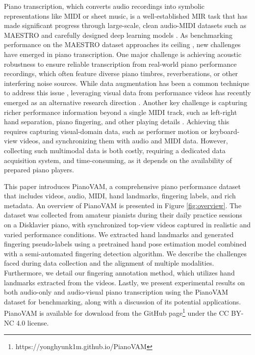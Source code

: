 \documentclass{article}
\begin{document}
Piano transcription, which converts audio recordings into symbolic representations like MIDI or sheet music, is a well-established MIR task that has made significant progress through large-scale, clean audio-MIDI datasets such as MAESTRO \cite{ISMIR18Hawthorne} and carefully designed deep learning models \cite{TASLP21Kong, ISMIR22Wei}. As benchmarking performance on the MAESTRO dataset approaches its ceiling \cite{ISMIR24Yan}, new challenges have emerged in piano transcription. One major challenge is achieving acoustic robustness to ensure reliable transcription from real-world piano performance recordings, which often feature diverse piano timbres, reverberations, or other interfering noise sources. While data augmentation has been a common technique to address this issue \cite{ICLR19Hawthorne, Edwards2024}, leveraging visual data from performance videos has recently emerged as an alternative research direction \cite{CJE15Wan, DAFx21Wang, ICASSPW23Li, TASLP24Li}. Another key challenge is capturing richer performance information beyond a single MIDI track, such as left-right hand separation, piano fingering, and other playing details \cite{InfoSci20Nakamura, MM22Ramoneda}. Achieving this requires capturing visual-domain data, such as performer motion or keyboard-view videos, and synchronizing them with audio and MIDI data. However, collecting such multimodal data is both costly, requiring a dedicated data acquisition system, and time-consuming, as it depends on the availability of prepared piano players. 

This paper introduces PianoVAM, a comprehensive piano performance dataset that includes videos, audio, MIDI, hand landmarks, fingering labels, and rich metadata. An overview of PianoVAM is presented in Figure \ref{fig:overview}. The dataset was collected from amateur pianists during their daily practice sessions on a Disklavier piano, with synchronized top-view videos captured in realistic and varied performance conditions. We extracted hand landmarks and generated fingering pseudo-labels using a pretrained hand pose estimation model combined with a semi-automated fingering detection algorithm.  We describe the challenges faced during data collection and the alignment of multiple modalities. Furthermore, we detail our fingering annotation method, which utilizes hand landmarks extracted from the videos. Lastly, we present experimental results on both audio-only and audio-visual piano transcription using the PianoVAM dataset for benchmarking, along with a discussion of its potential applications. PianoVAM is available for download from the GitHub page\footnote{https://yonghyunk1m.github.io/PianoVAM\label{github-link}} under the CC BY-NC 4.0 license.
\end{document}
